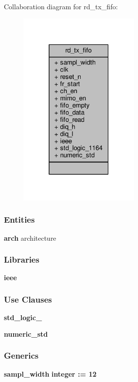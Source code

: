 Collaboration diagram for rd\+\_\+tx\+\_\+fifo\+:\nopagebreak
\begin{figure}[H]
\begin{center}
\leavevmode
\includegraphics[width=171pt]{dc/d9c/classrd__tx__fifo__coll__graph}
\end{center}
\end{figure}
\subsubsection*{Entities}
\begin{DoxyCompactItemize}
\item 
{\bf arch} architecture
\end{DoxyCompactItemize}
\subsubsection*{Libraries}
 \begin{DoxyCompactItemize}
\item 
{\bf ieee} 
\end{DoxyCompactItemize}
\subsubsection*{Use Clauses}
 \begin{DoxyCompactItemize}
\item 
{\bf std\+\_\+logic\+\_}   
\item 
{\bf numeric\+\_\+std}   
\end{DoxyCompactItemize}
\subsubsection*{Generics}
 \begin{DoxyCompactItemize}
\item 
{\bf sampl\+\_\+width} {\bfseries {\bfseries \textcolor{comment}{integer}\textcolor{vhdlchar}{ }\textcolor{vhdlchar}{ }\textcolor{vhdlchar}{\+:}\textcolor{vhdlchar}{=}\textcolor{vhdlchar}{ }\textcolor{vhdlchar}{ } \textcolor{vhdldigit}{12} \textcolor{vhdlchar}{ }}}
\end{DoxyCompactItemize}
